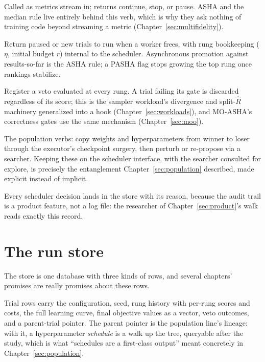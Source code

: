 \begin{description}[style=nextline, leftmargin=1.6em, itemsep=2pt]
\item[report(trial, fidelity, value)] Called as metrics stream in;
returns continue, stop, or pause. ASHA and the median rule live
entirely behind this verb, which is why they ask nothing of training
code beyond streaming a metric (Chapter~\ref{sec:multifidelity}).
\item[promote()] Return paused or new trials to run when a worker
frees, with rung bookkeeping ($\eta$, initial budget $r$) internal
to the scheduler. Asynchronous promotion against results-so-far is
the ASHA rule; a PASHA flag stops growing the top rung once
rankings stabilize.
\item[gate(predicate)] Register a veto evaluated at every rung. A
trial failing its gate is discarded regardless of its score; this is
the sampler workload's divergence and split-$\widehat{R}$ machinery
generalized into a hook (Chapter~\ref{sec:workloads}), and MO-ASHA's
correctness gates use the same mechanism (Chapter~\ref{sec:moo}).
\item[exploit(loser, winner) and explore(config)] The population
verbs: copy weights and hyperparameters from winner to loser through
the executor's checkpoint surgery, then perturb or re-propose via a
searcher. Keeping these on the scheduler interface, with the
searcher consulted for explore, is precisely the entanglement
Chapter~\ref{sec:population} described, made explicit instead of
implicit.
\end{description}

Every scheduler decision lands in the store with its reason, because
the audit trail is a product feature, not a log file: the researcher
of Chapter~\ref{sec:product}'s walk reads exactly this record.

\section{The run store}

The store is one database with three kinds of rows, and several
chapters' promises are really promises about these rows.

Trial rows carry the configuration, seed, rung history with
per-rung scores and costs, the full learning curve, final objective
values as a vector, veto outcomes, and a parent-trial pointer. The
parent pointer is the population line's lineage: with it, a
hyperparameter \emph{schedule} is a walk up the tree, queryable
after the study, which is what ``schedules are a first-class
output'' meant concretely in Chapter~\ref{sec:population}.

